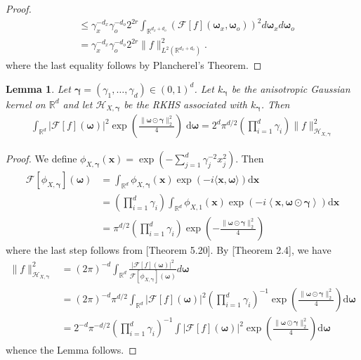 \documentclass[11pt]{article}
\newcommand{\bgamma}{\boldsymbol{\gamma}}
\newcommand{\bx}{\mathbf x}
\newcommand{\bomega}{\boldsymbol{\omega}}
\newcommand{\calF}{\mathcal{F}}
\newcommand{\calH}{\mathcal{H}}
\newcommand{\R}{\mathbb{R}}
\newcommand{\0}{\mathbf{0}}
\newtheorem{lem}{Lemma}[section]
\begin{document}
\begin{appendix}
\begin{proof}
\begin{align*}
    &\leq \gamma_x^{-d_x} \gamma_o^{-d_o} 2^{2r} \int_{\R^{d_x+d_o}} \left(\calF[f](\bomega_x,\bomega_o) \right)^2 d\bomega_x d\bomega_o \\
    &= \gamma_x^{-d_x} \gamma_o^{-d_o} 2^{2r} \| f\|_{L^2(\R^{d_x+d_o})}^2 .
\end{align*}
where the last equality follows by Plancherel's Theorem. 
\end{proof}

\begin{lem}
\label{lem:unit_ball_grkhs}
    Let $\bgamma = (\gamma_1,\dots,\gamma_d)\in (0,1)^{d}$. Let $k_{\bgamma}$ be the anisotropic Gaussian kernel on $\R^d$ and let $\calH_{X,\bgamma}$ be the RKHS associated with $k_{\bgamma}$. Then 
\begin{align*}
    \int_{\R^{d}} |\calF[f](\bomega)|^2\exp\left(\frac{\|\bomega\odot \bgamma\|_{2}^{2}}{4}\right) \;\mathrm{d}\bomega = 2^{d} \pi^{d/2} \left(\prod_{i=1}^{d} \gamma_i\right) \|f\|_{\calH_{X,\bgamma}}^2
\end{align*}
\end{lem}
\begin{proof}
We define $\phi_{X,\bgamma}(\bx) = \exp(-\sum_{j=1}^{d} \gamma_j^{-2} x_j^2)$.
Then
\begin{align*}
    \calF[\phi_{X,\bgamma}](\bomega) &= \int_{\R^{d}}\phi_{X,\bgamma}(\bx)\exp(-i\langle \bx, \bomega\rangle) \mathrm{d}\bx \\
    &= \left(\prod_{i=1}^{d}\gamma_i\right) \int_{\R^{d}}\phi_{X,1}(\bx)\exp\left(-i\left\langle \bx, \bomega \odot \bgamma\right\rangle\right)\mathrm{d}\bx\\
    &= \pi^{d/2} \left(\prod_{i=1}^{d}\gamma_i\right)\exp\left(-\frac{\|\bomega\odot \bgamma\|_{2}^{2}}{4}\right)
\end{align*}
where the last step follows from \cite{wendland2004scattered}[Theorem 5.20]. By \cite{kanagawa2018gaussianprocesseskernelmethods}[Theorem 2.4], we have
\begin{align*}
    \|f\|_{\calH_{X,\bgamma}}^2 &= (2\pi)^{-d} \int_{\R^d} \frac{|\calF[f](\bomega)|^2}{\calF[\phi_{X,\bgamma}](\bomega)} d \bomega \\
    &=(2\pi)^{-d} \pi^{d/2} \int_{\R^d} |\calF[f](\bomega)|^2 \left(\prod_{i=1}^{d}\gamma_i\right)^{-1}\exp\left(\frac{\|\bomega\odot \bgamma\|_{2}^{2}}{4}\right) \mathrm{d}\bomega\; \\
    &= 2^{-d} \pi^{-d/2} \left(\prod_{i=1}^{d} \gamma_i\right)^{-1} \int  |\calF[f](\bomega)|^2 \exp\left(\frac{\|\bomega\odot \bgamma\|_{2}^{2}}{4}\right) \mathrm{d}\bomega
\end{align*}
whence the Lemma follows. 
\end{proof}




\end{appendix}
\end{document}
